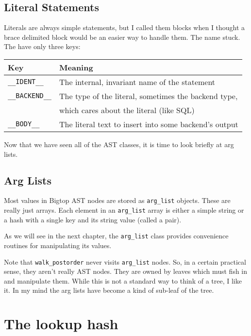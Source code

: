 \subsection*{Literal Statements}

Literals are always simple statements, but I called them blocks when I
thought a brace delimited block would be an easier way to handle them.
The name stuck.  The have only three keys:

\begin{tabular}{l|l}
Key                & Meaning                                               \\
\hline
\verb+__IDENT__+   & The internal, invariant name of the statement         \\
\verb+__BACKEND__+ & The type of the literal, sometimes the backend type,  \\
                   & which cares about the literal (like SQL)              \\
\verb+__BODY__+    & The literal text to insert into some backend's output \\
\end{tabular}

Now that we have seen all of the AST classes, it is time to look briefly
at arg lists.

\subsection*{Arg Lists}

Most values in Bigtop AST nodes are stored as \verb+arg_list+ objects.
These are really just arrays.  Each element in an \verb+arg_list+ array
is either a simple string or a hash with a single key and its string value
(called a pair).

As we will see in the next chapter, the \verb+arg_list+ class provides
convenience routines for manipulating its values.

Note that \verb+walk_postorder+ never visits \verb+arg_list+ nodes.
So, in a certain practical sense, they aren't really AST nodes.  They are
owned by leaves which must fish in and manipulate them.  While this is
not a standard way to think of a tree, I like it.  In my mind the
arg lists have become a kind of sub-leaf of the tree.

\section{The lookup hash}

